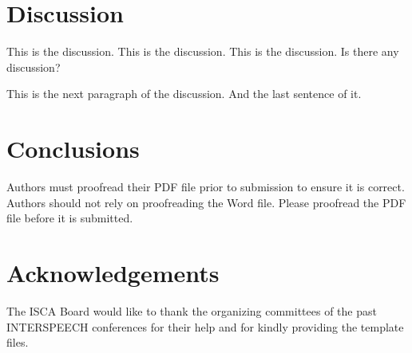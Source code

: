 \documentclass[a4paper]{article}
\begin{document}
  \section{Discussion}
  
    This is the discussion. 
    This is the discussion. 
    This is the discussion.
    Is there any discussion?

    This is the next paragraph of the discussion. 
    And the last sentence of it.


  \section{Conclusions}

     Authors must proofread their PDF file prior to submission to ensure it is correct. 
     Authors should not rely on proofreading the Word file. 
     Please proofread the PDF file before it is submitted.


  \section{Acknowledgements}
  
    The ISCA Board would like to thank the organizing committees of the past INTERSPEECH conferences for their help and for kindly providing the template files.


  \newpage
  \eightpt
  

  

\end{document}
